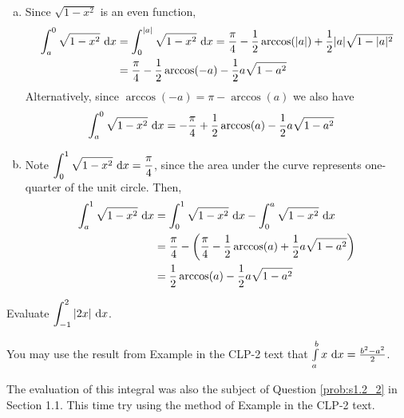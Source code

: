 \begin{solution}
\begin{enumerate}[(a)]
\item Since $\sqrt{1-x^2}$ is an even function,
\begin{align*}
\int_{a}^0 \sqrt{1-x^2}\ \mathrm{d}x 
&=\int_{0}^{|a|} \sqrt{1-x^2}\ \mathrm{d}x  = \frac{\pi}{4} - \frac{1}{2}\arccos(|a|)+\frac{1}{2}|a|\sqrt{1-|a|^2}\\
&=\frac{\pi}{4} - \frac{1}{2}\arccos(-a)-\frac{1}{2}a\sqrt{1-a^2}
\end{align*}
Alternatively, since $\arccos(-a) = \pi-\arccos(a)$ we also have
\begin{align*}
\int_{a}^0 \sqrt{1-x^2}\ \mathrm{d}x 
&=-\frac{\pi}{4} + \frac{1}{2}\arccos(a)-\frac{1}{2}a\sqrt{1-a^2}
\end{align*}

\item Note $\displaystyle\int_{0}^1 \sqrt{1-x^2}\ \mathrm{d}x=\frac{\pi}{4}$, since the area under the curve represents one-quarter of the unit circle. Then,
\begin{align*}\displaystyle\int_{a}^1 \sqrt{1-x^2}\ \mathrm{d}x&=
\displaystyle\int_{0}^1 \sqrt{1-x^2}\ \mathrm{d}x-
\displaystyle\int_{0}^a \sqrt{1-x^2}\ \mathrm{d}x\\
&=\frac{\pi}{4}-\left(\frac{\pi}{4} - \frac{1}{2}\arccos(a)+\frac{1}{2}a\sqrt{1-a^2}\right)\\
&=\frac{1}{2}\arccos(a)-\frac{1}{2}a\sqrt{1-a^2}
\end{align*}
\end{enumerate}

\end{solution}



\begin{Mquestion}[M105 2013A]\label{prob:s1.2_2}
Evaluate ${\displaystyle\int_{-1}^2 |2x|\ \dee{x}}$.

You may use the result from  Example   in the CLP-2 text
that
$
\int\limits_a^b x\ \dee{x}=\frac{b^2-a^2}{2}
$.

\end{Mquestion}

\begin{hint}
The evaluation of this integral was also the subject of Question
\ref{prob:s1.2_2} in Section 1.1. This time try using the method
of Example  in the
CLP-2 text.
\end{hint}

